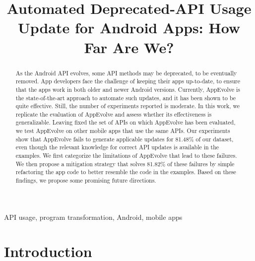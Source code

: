\documentclass[conference]{IEEEtran}
\begin{document}
\def \toolname {AppEvolve}
\title{Automated Deprecated-API Usage Update for Android Apps: How Far Are We?}

\author{
}

\maketitle

\begin{abstract}
As the Android API evolves, some API methods may be deprecated, to be
eventually removed.  App developers face the challenge of keeping their
apps up-to-date, to ensure that the apps work in both older and newer
Android versions.  Currently, AppEvolve is the state-of-the-art approach to
automate such updates, and it has been shown to be quite effective.  Still,
the number of experiments reported is moderate. In this work, we replicate
the evaluation of AppEvolve and assess whether its effectiveness is
generalizable. Leaving fixed the set of APIs on which AppEvolve has been
evaluated, we test AppEvolve on other mobile apps that use the same
APIs. Our experiments show that AppEvolve fails to generate applicable
updates for 81.48\% of our dataset, even though the relevant knowledge for
correct API updates is available in the examples. We first categorize the
limitations of AppEvolve that lead to these failures.  We then propose a
mitigation strategy that solves 81.82\% of these failures by simple refactoring 
the app code to better resemble the code in the examples.  
Based on these findings, we propose some promising
future directions.

\end{abstract}

\begin{IEEEkeywords}
API usage, program transformation, Android, mobile apps
\end{IEEEkeywords}

\section{Introduction}

\end{document}
